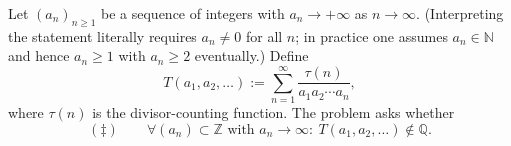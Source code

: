 Let $(a_n)_{n\ge1}$ be a sequence of integers with $a_n\to +\infty$ as $n\to\infty$.
(Interpreting the statement literally requires $a_n\neq0$ for all $n$; in practice one assumes $a_n\in\mathbb{N}$ and hence $a_n\ge 1$ with $a_n\ge2$ eventually.)
Define
\[
T(a_1,a_2,\dots):=\sum_{n=1}^{\infty}\frac{\tau(n)}{a_1a_2\cdots a_n},
\]
where $\tau(n)$ is the divisor-counting function.
The problem asks whether
\[
(\ddagger)\qquad \forall (a_n)\subset\mathbb{Z}\text{ with }a_n\to\infty:\ T(a_1,a_2,\dots)\notin\mathbb{Q}.
\]
